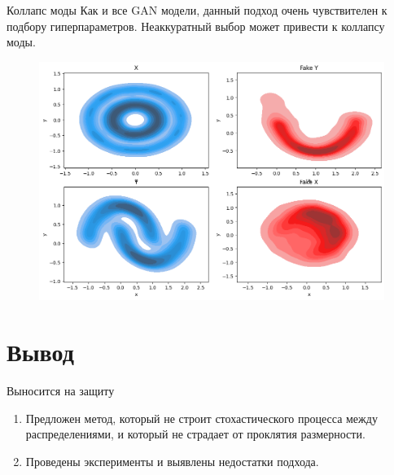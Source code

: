 \documentclass[10pt,pdf,hyperref={unicode}]{beamer}
\begin{document}
\begin{frame}{Коллапс моды}
    \justifying
    Как и все GAN модели, данный подход очень чувствителен к подбору гиперпараметров. Неаккуратный выбор может привести к коллапсу моды.
    \begin{figure}
        \centering
        \includegraphics[width=0.8\linewidth]{slides//4th//figures/mode_collapse.png}
    \end{figure}
\end{frame}


\section{Вывод}
\begin{frame}{Выносится на защиту}
\justifying
    \begin{enumerate}
        \justifying
        \item Предложен метод, который не строит стохастического процесса между распределениями, и который не страдает от проклятия размерности.
        \item Проведены эксперименты и выявлены недостатки подхода. 
    \end{enumerate}
\end{frame}
\end{document}
